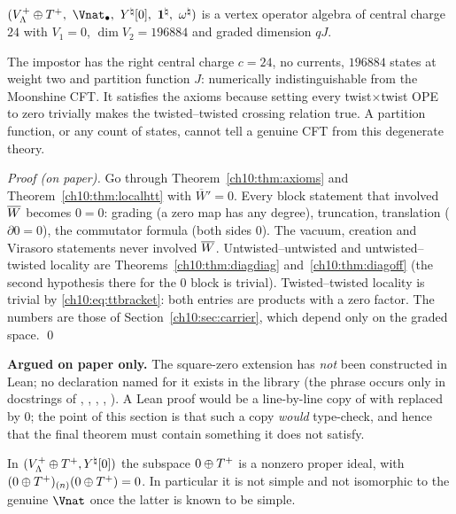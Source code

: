 \begin{proposition}\label{ch10:prop:sqzero}
$(\chtenVP\oplus\chtenTP,\ \Vnat_\bullet,\ Y^\natural[0],\ \mathbf1^\natural,\ \omega^\natural)$ is a vertex
operator algebra of central charge $24$ with $V_1=0$, $\dim V_2=196884$ and graded dimension $qJ$.
\end{proposition}

\begin{physics}
The impostor has the right central charge $c=24$, no currents, $196884$ states at weight two and partition function $J$: numerically indistinguishable from the Moonshine CFT. It satisfies the axioms because setting every twist$\times$twist OPE to zero trivially makes the twisted--twisted crossing relation true. A partition function, or any count of states, cannot tell a genuine CFT from this degenerate theory.
\end{physics}

\emph{Proof (on paper).}  Go through Theorem~\ref{ch10:thm:axioms} and
Theorem~\ref{ch10:thm:localhtt} with $\overline W'=0$.  Every block statement that involved
$\overline{W}$ becomes $0=0$: grading (a zero map has any degree), truncation, translation
($\partial0=0$), the commutator formula (both sides $0$).  The vacuum, creation and Virasoro
statements never involved $\overline{W}$.  Untwisted--untwisted and untwisted--twisted locality are
Theorems~\ref{ch10:thm:diagdiag} and~\ref{ch10:thm:diagoff} (the second hypothesis there for the
$0$ block is trivial).  Twisted--twisted locality is trivial by \eqref{ch10:eq:ttbracket}: both
entries are products with a zero factor.  The numbers are those of
Section~\ref{ch10:sec:carrier}, which depend only on the graded space. \qed

\begin{status}
\textbf{Argued on paper only.}  The square-zero extension has \emph{not} been constructed in Lean;
no declaration named for it exists in the library (the phrase occurs only in docstrings of
, , ,
, ).  A Lean proof would be a line-by-line copy of
 with  replaced by $0$; the point of this section is
that such a copy \emph{would} type-check, and hence that the final theorem must contain something
it does not satisfy.
\end{status}

\begin{proposition}\label{ch10:prop:sqnotsimple}
In $(V_{\Lambda}^{+}\oplus T^{+},Y^\natural[0])$ the subspace $0\oplus T^{+}$ is a nonzero proper ideal,
with $(0\oplus T^{+})_{(n)}(0\oplus T^{+})=0$.  In particular it is not simple and not
isomorphic to the genuine $\Vnat$ once the latter is known to be simple.
\end{proposition}

